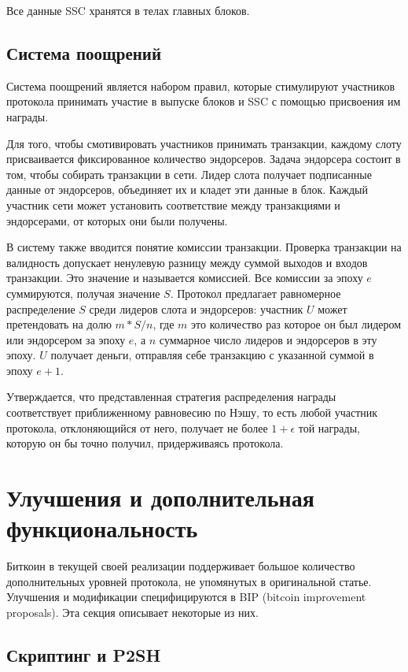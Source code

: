 \documentclass[specification,annotation]{itmo-student-thesis}
\begin{document}
Все данные SSC хранятся в телах главных блоков.

\subsection{Система поощрений}

Система поощрений является набором правил, которые стимулируют
участников протокола принимать участие в выпуске блоков и SSC с
помощью присвоения им награды.

Для того, чтобы смотивировать участников принимать транзакции, каждому
слоту присваивается фиксированное количество эндорсеров. Задача
эндорсера состоит в том, чтобы собирать транзакции в сети. Лидер слота
получает подписанные данные от эндорсеров, объединяет их и кладет эти
данные в блок. Каждый участник сети может установить соответствие
между транзакциями и эндорсерами, от которых они были получены.

В систему также вводится понятие комиссии транзакции. Проверка
транзакции на валидность допускает ненулевую разницу между суммой
выходов и входов транзакции. Это значение и называется комиссией. Все
комиссии за эпоху $e$ суммируются, получая значение $S$. Протокол
предлагает равномерное распределение $S$ среди лидеров слота и
эндорсеров: участник $U$ может претендовать на долю $m * S / n$, где
$m$ это количество раз которое он был лидером или эндорсером за эпоху
$e$, а $n$ суммарное число лидеров и эндорсеров в эту эпоху. $U$
получает деньги, отправляя себе транзакцию с указанной суммой в эпоху
$e+1$.

Утверждается, что представленная стратегия распределения награды
соответствует приближенному равновесию по Нэшу, то есть любой участник
протокола, отклоняющийся от него, получает не более $1 + \epsilon$ той
награды, которую он бы точно получил, придерживаясь протокола.

\section{Улучшения и дополнительная функциональность}

Биткоин в текущей своей реализации поддерживает большое количество
дополнительных уровней протокола, не упомянутых в оригинальной
статье. Улучшения и модификации специфицируются в BIP (bitcoin
improvement proposals). Эта секция описывает некоторые из них.

\subsection{Скриптинг и P2SH}
\end{document}
